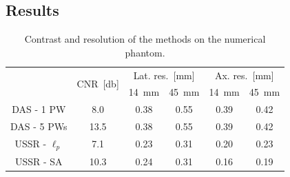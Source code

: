 \documentclass[conference]{IEEEtran}
\begin{document}
\subsection{Results}
\label{subsec_results}
\begin{table}[htb]
	\caption{Contrast and resolution of the methods on the numerical phantom.}
	\begin{center}
		\begin{tabular}{ |c | c c c c c|}
			\hline
			& \multirow{2}{*}{CNR~[\si{\decibel}]} & \multicolumn{2}{c}{Lat. res.~[\si{\milli\metre}]} & \multicolumn{2}{c|}{Ax. res.~[\si{\milli\metre}]} \\
			& &\SI{14}{\milli\metre} & \SI{45}{\milli\metre} & \SI{14}{\milli\metre} & \SI{45}{\milli\metre}\\
			DAS - \num{1} PW & \num{8.0} &\num{0.38} &\num{0.55} &\num{0.39} &\num{0.42}\\
			DAS - \num{5} PWs & \num{13.5} &\num{0.38} &\num{0.55} &\num{0.39} &\num{0.42}\\
			USSR - $\ell_p$ & \num{7.1} &\num{0.23} &\num{0.31} &\num{0.20} &\num{0.23}\\
			USSR - SA & \num{10.3} &\num{0.24} &\num{0.31} &\num{0.16} &\num{0.19}\\
			\hline
		\end{tabular}
	\end{center}
	\label{tab_results_numerical}
\end{table}
\newlength{\CohSubFigWidth}
\newlength{\CohSubFigHeight}
\setlength{\CohSubFigWidth}{0.24\textwidth}
\end{document}
